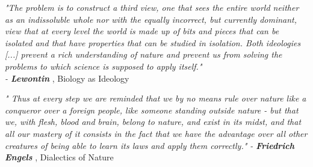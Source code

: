 \documentclass[master=elt, cleveref, autoref, masteroption=eg]{kulemt}
\begin{document}
 

\begin{preface}
  
   \textit{
      "The problem is to construct a third view, one that sees the entire world neither as an indissoluble whole nor with the equally incorrect, but currently dominant, view that at every level the world is made up of bits and pieces that can be isolated and that have properties that can be studied in isolation. Both ideologies [...] prevent a rich understanding of nature and prevent us from solving the problems to which science is supposed to apply itself." \\
      - \textbf{Lewontin}
      }, Biology as Ideology

   \textit{
      "
      Thus at every step we are reminded that we by no means rule over nature like a conqueror over a foreign people, 
      like someone standing outside nature - but that we, with flesh, blood and brain, belong to nature, 
      and exist in its midst, and that all our mastery of it consists in the fact that we have the advantage over 
      all other creatures of being able to learn its laws and apply them correctly."
      - \textbf{Friedrich Engels}
      }, Dialectics of Nature
  
\end{preface}


\tableofcontents
\newpage
\end{document}
